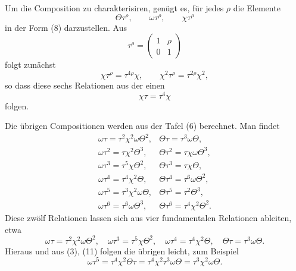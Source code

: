 \documentclass[11pt]{article}
\providecommand{\mat}[4]{\begin{pmatrix}#1&#2\\#3&#4\end{pmatrix}}
\providecommand{\mat}[4]{\begin{pmatrix}#1&#2\\#3&#4\end{pmatrix}}
\providecommand{\mat}[1]{\begin{pmatrix}#1\end{pmatrix}}
\begin{document}
Um die Composition zu charakterisiren, genügt es, für jedes $\rho$ die Elemente
\begin{equation}
 \Theta\tau^\rho,
 \qquad \omega\tau^\rho,
 \qquad \chi\tau^\rho
 \tag{9}
\end{equation}
in der Form (8) darzustellen. Aus
\begin{equation}
 \tau^\rho=\mat{1}{\rho}{0}{1}
 \tag{10}
\end{equation}
folgt zunächst
\begin{equation}
 \chi\tau^\rho=\tau^{4\rho}\chi,
 \qquad
 \chi^2\tau^\rho=\tau^{2\rho}\chi^2,
 \tag{11}
\end{equation}
so dass diese sechs Relationen aus der einen
\begin{equation}
 \chi\tau=\tau^4\chi
 \tag{12}
\end{equation}
folgen.

Die übrigen Compositionen werden aus der Tafel (6) berechnet. Man findet
\begin{equation}
\begin{array}{ll}
 \omega\tau=\tau^2\chi^2\omega\Theta^2,&
 \Theta\tau=\tau^3\omega\Theta,\\
 \omega\tau^2=\tau\chi^2\Theta^3,&
 \Theta\tau^2=\tau\chi\omega\Theta^3,\\
 \omega\tau^3=\tau^5\chi\Theta^2,&
 \Theta\tau^3=\tau\chi\Theta,\\
 \omega\tau^4=\tau^4\chi^2\Theta,&
 \Theta\tau^4=\tau^6\omega\Theta^2,\\
 \omega\tau^5=\tau^3\chi^2\omega\Theta,&
 \Theta\tau^5=\tau^2\Theta^3,\\
 \omega\tau^6=\tau^6\omega\Theta^3,&
 \Theta\tau^6=\tau^4\chi^2\Theta^2.
\end{array}
\tag{13}
\end{equation}
Diese zwölf Relationen lassen sich aus vier fundamentalen Relationen ableiten, etwa
\begin{equation}
 \omega\tau=\tau^2\chi^2\omega\Theta^2,
 \quad \omega\tau^3=\tau^5\chi\Theta^2,
 \quad \omega\tau^4=\tau^4\chi^2\Theta,
 \quad \Theta\tau=\tau^3\omega\Theta.
 \tag{14}
\end{equation}
Hieraus und aus (3), (11) folgen die übrigen leicht, zum Beispiel
\[
 \omega\tau^5=\tau^4\chi^2\Theta\tau
 =\tau^4\chi^2\tau^3\omega\Theta
 =\tau^3\chi^2\omega\Theta.
\]
\end{document}
